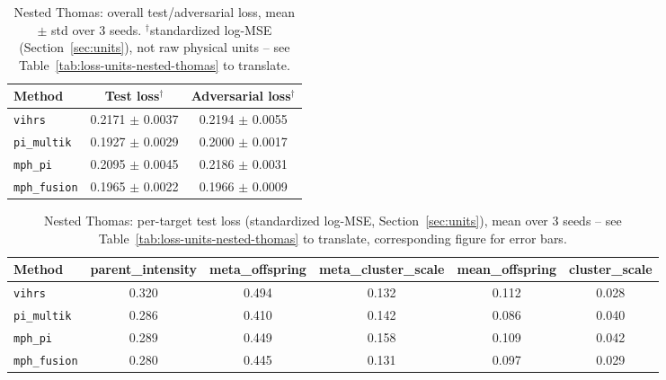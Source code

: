 \begin{table}[htbp]
\centering
\small
\begin{tabular}{lcc}
\toprule
Method & Test loss$^\dagger$ & Adversarial loss$^\dagger$ \\
\midrule
\texttt{vihrs} & 0.2171 $\pm$ 0.0037 & 0.2194 $\pm$ 0.0055 \\
\texttt{pi\_multik} & 0.1927 $\pm$ 0.0029 & 0.2000 $\pm$ 0.0017 \\
\texttt{mph\_pi} & 0.2095 $\pm$ 0.0045 & 0.2186 $\pm$ 0.0031 \\
\texttt{mph\_fusion} & 0.1965 $\pm$ 0.0022 & 0.1966 $\pm$ 0.0009 \\
\bottomrule
\end{tabular}
\caption{Nested Thomas: overall test/adversarial loss, mean $\pm$ std over 3 seeds. $^\dagger$standardized log-MSE (Section~\ref{sec:units}), not raw physical units -- see Table~\ref{tab:loss-units-nested-thomas} to translate.}
\label{tab:nested-thomas-overall}
\end{table}

\begin{table}[htbp]
\centering
\small
\begin{tabular}{lccccc}
\toprule
Method & parent\_intensity & meta\_offspring & meta\_cluster\_scale & mean\_offspring & cluster\_scale \\
\midrule
\texttt{vihrs} & 0.320 & 0.494 & 0.132 & 0.112 & 0.028 \\
\texttt{pi\_multik} & 0.286 & 0.410 & 0.142 & 0.086 & 0.040 \\
\texttt{mph\_pi} & 0.289 & 0.449 & 0.158 & 0.109 & 0.042 \\
\texttt{mph\_fusion} & 0.280 & 0.445 & 0.131 & 0.097 & 0.029 \\
\bottomrule
\end{tabular}
\caption{Nested Thomas: per-target test loss (standardized log-MSE, Section~\ref{sec:units}), mean over 3 seeds -- see Table~\ref{tab:loss-units-nested-thomas} to translate, corresponding figure for error bars.}
\label{tab:nested-thomas-per-target}
\end{table}
